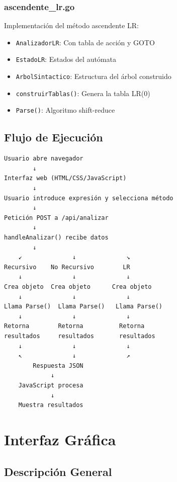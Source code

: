\documentclass[12pt]{article}
\begin{document}
\subsubsection{ascendente\_lr.go}

Implementación del método ascendente LR:

\begin{itemize}
    \item \texttt{AnalizadorLR}: Con tabla de acción y GOTO
    \item \texttt{EstadoLR}: Estados del autómata
    \item \texttt{ArbolSintactico}: Estructura del árbol construido
    \item \texttt{construirTablas()}: Genera la tabla LR(0)
    \item \texttt{Parse()}: Algoritmo shift-reduce
\end{itemize}

\subsection{Flujo de Ejecución}

\begin{verbatim}
Usuario abre navegador
        ↓
Interfaz web (HTML/CSS/JavaScript)
        ↓
Usuario introduce expresión y selecciona método
        ↓
Petición POST a /api/analizar
        ↓
handleAnalizar() recibe datos
        ↓
    ↙              ↓              ↘
Recursivo    No Recursivo        LR
    ↓              ↓              ↓
Crea objeto  Crea objeto      Crea objeto
    ↓              ↓              ↓
Llama Parse()  Llama Parse()   Llama Parse()
    ↓              ↓              ↓
Retorna        Retorna          Retorna
resultados     resultados       resultados
    ↓              ↓              ↓
    ↖              ↓              ↗
        Respuesta JSON
             ↓
    JavaScript procesa
             ↓
    Muestra resultados
\end{verbatim}

\section{Interfaz Gráfica}

\subsection{Descripción General}
\end{document}
